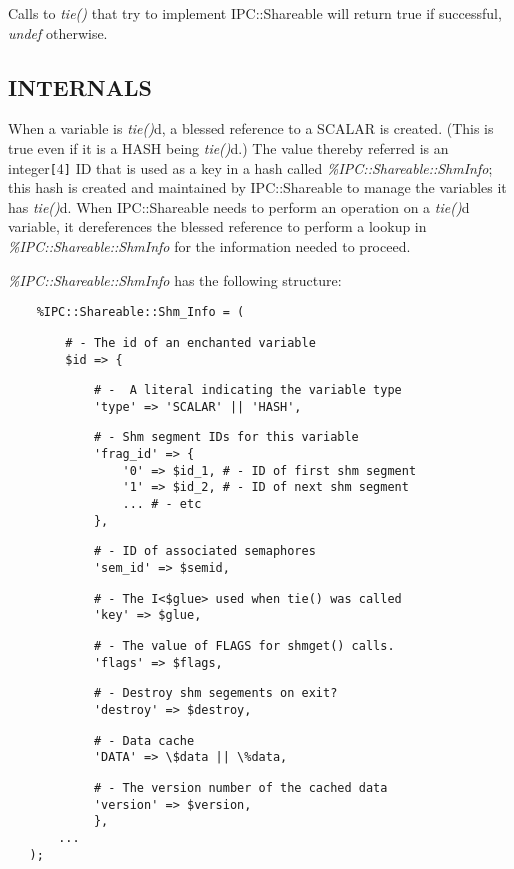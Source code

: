 Calls to {\em tie()\/} that try to implement IPC::Shareable will return true
if successful, {\em undef\/} otherwise.

\subsection*{INTERNALS}%

When a variable is {\em tie()\/}d, a blessed reference to a SCALAR is created.
(This is true even if it is a HASH being {\em tie()\/}d.)  The value thereby
referred is an integer{\tt [}4{\tt ]} ID that is used as a key in a hash called
{\em \%IPC::Shareable::Shm\underscore{}Info\/}; this hash is created and maintained by
IPC::Shareable to manage the variables it has {\em tie()\/}d.  When
IPC::Shareable needs to perform an operation on a {\em tie()\/}d variable, it
dereferences the blessed reference to perform a lookup in
{\em \%IPC::Shareable::Shm\underscore{}Info\/} for the information needed to proceed.

{\em \%IPC::Shareable::Shm\underscore{}Info\/} has the following structure:
\begin{verbatim}
    %IPC::Shareable::Shm_Info = (
\end{verbatim}
\begin{verbatim}
        # - The id of an enchanted variable
        $id => {
\end{verbatim}
\begin{verbatim}
            # -  A literal indicating the variable type
            'type' => 'SCALAR' || 'HASH',
\end{verbatim}
\begin{verbatim}
            # - Shm segment IDs for this variable
            'frag_id' => {
                '0' => $id_1, # - ID of first shm segment
                '1' => $id_2, # - ID of next shm segment
                ... # - etc
            },
\end{verbatim}
\begin{verbatim}
            # - ID of associated semaphores
            'sem_id' => $semid,
\end{verbatim}
\begin{verbatim}
            # - The I<$glue> used when tie() was called
            'key' => $glue,
\end{verbatim}
\begin{verbatim}
            # - The value of FLAGS for shmget() calls.
            'flags' => $flags,
\end{verbatim}
\begin{verbatim}
            # - Destroy shm segements on exit?
            'destroy' => $destroy,
\end{verbatim}
\begin{verbatim}
            # - Data cache
            'DATA' => \$data || \%data,
\end{verbatim}
\begin{verbatim}
            # - The version number of the cached data
            'version' => $version,
            },
       ...
   );
\end{verbatim}

